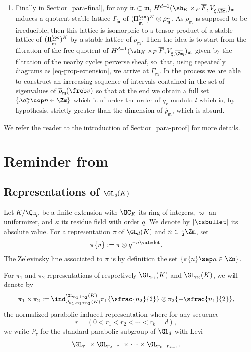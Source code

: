 \begin{enumerate}
\item
Finally in Section \ref{para-final},
for any $\widetilde{\mathfrak m} \subset \mathfrak m$,
$H^{d-1}(\sh_K \times_F \overline F,V_{\xi,\overline \Zm_l})_{\mathfrak m}$
induces a quotient stable lattice $\Gamma_{\widetilde{\mathfrak m}}$ of $(\Pi_{\widetilde{\mathfrak m}}^{\oo})^K \otimes
\rho_{\widetilde{\mathfrak m}}$. As
$\overline \rho_{\mathfrak m}$ is supposed to be irreducible, then this
lattice is isomorphic to a tensor product of a stable lattice of
$(\Pi_{\widetilde{\mathfrak m}}^{\oo})^K$ by a stable lattice of
$\rho_{\widetilde{\mathfrak m}}$. Then the idea is to start from the filtration
of the free quotient of $H^{d-1}(\sh_K \times_F \overline F,
V_{\xi,\overline \Zm_l})_{\mathfrak m}$ given
by the filtration of the nearby cycles perverse sheaf, so~that, using repeatedly
diagrams as \eqref{eq-prop-extension}, we arrive at $\Gamma_{\widetilde{\mathfrak m}}$.
In the process we are able to construct an increasing sequence of intervals
contained in the set of eigenvalues of $\overline \rho_{\mathfrak m}(\frob v)$
so that at the end we obtain a full set $\{\lambda q_v^n \sep n \in \Zm\}$
which is of order the order of $q_v$ modulo $l$ which is, by hypothesis,
strictly greater than the dimension of $\overline \rho_{\mathfrak m}$, which is
absurd.
\end{enumerate}

We refer the reader to the introduction of Section \ref{para-proof} for more details.

\section{\texorpdfstring{Reminder from \cite{boyer-imj}}{R}}

\subsection{Representations of $\GL_d(K)$}
\label{para-gen}

Let $K/\Qm_p$ be a finite extension with $\OC_K$ its ring of integers,
$\varpi$ an uniformizer, and
$\kappa$ its residue field with order $q$.
We denote by $|\csbullet|$ its absolute value.
For a representation $\pi$ of $\GL_d(K)$ and $n \in \frac{1}{2} \Zm$, set
\[
\pi \{n\}:= \pi \otimes q^{-n \val \circ \det}.
\]
The Zelevinsky line associated to $\pi$ is by definition the set
$\{\pi \{n\}\sep n \in \Zm\}$.

\begin{notas} \label{nota-ind}
For $\pi_1$ and $\pi_2$ representations of respectively $\GL_{n_1}(K)$ and
$\GL_{n_2}(K)$, we will denote by
\[
\pi_1 \times \pi_2:=\ind_{P_{n_1,n_1+n_2}(K)}^{\GL_{n_1+n_2}(K)}
\pi_1 \{\sfrac{n_2}{2}\} \otimes \pi_2 \{-\sfrac{n_1}{2}\},
\]
the normalized parabolic induced representation where for any sequence
\[
\underline r=(0< r_1 < r_2 < \cdots < r_k=d),
\]
we write $P_{\underline r}$ for
the standard parabolic subgroup of $\GL_d$ with Levi
\[
\GL_{r_1} \times \GL_{r_2-r_1} \times \cdots \times \GL_{r_k-r_{k-1}}.
\]
\end{notas}


